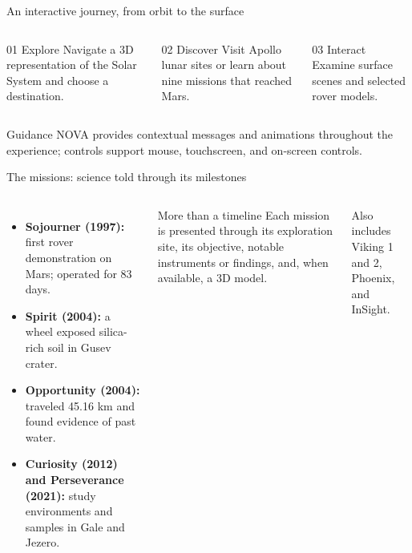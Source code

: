 \documentclass[aspectratio=169,11pt]{beamer}
\newcommand{\tagline}[1]{{\small\color{muted}#1}}
\newcommand{\keyterm}[1]{{\color{cyan}\textbf{#1}}}
\begin{document}
\begin{frame}{An interactive journey, from orbit to the surface}
  \begin{columns}[T,onlytextwidth]
      \begin{block}{01 \quad Explore}
        Navigate a 3D representation of the Solar System and choose a destination.
      \end{block}
      \begin{block}{02 \quad Discover}
        Visit Apollo lunar sites or learn about nine missions that reached Mars.
      \end{block}
      \begin{block}{03 \quad Interact}
        Examine surface scenes and selected rover models.
      \end{block}
  \end{columns}
  \vspace{0.3cm}
  \begin{alertblock}{Guidance}
    NOVA provides contextual messages and animations throughout the experience;
    controls support mouse, touchscreen, and on-screen controls.
  \end{alertblock}
\end{frame}

\begin{frame}{The missions: science told through its milestones}
  \begin{columns}[T,onlytextwidth]
      \begin{itemize}
        \item \keyterm{Sojourner (1997):} first rover demonstration on Mars; operated for 83 days.
        \item \keyterm{Spirit (2004):} a wheel exposed silica-rich soil in Gusev crater.
        \item \keyterm{Opportunity (2004):} traveled 45.16 km and found evidence of past water.
        \item \keyterm{Curiosity (2012) and Perseverance (2021):} study environments and samples in Gale and Jezero.
      \end{itemize}
      \begin{block}{More than a timeline}
        Each mission is presented through its exploration site, its objective,
        notable instruments or findings, and, when available,
        a 3D model.
      \end{block}
      \vspace{0.2cm}
      \tagline{Also includes Viking 1 and 2, Phoenix, and InSight.}
  \end{columns}
\end{frame}
\end{document}
